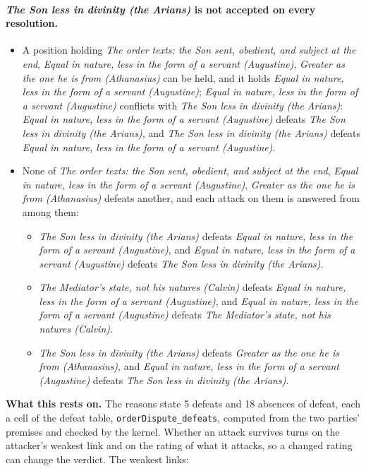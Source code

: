 \documentclass[11pt,paper=\testimonypaper,DIV=13,parskip=false]{scrartcl}
\begin{document}
\paragraph{\emph{The Son less in divinity (the Arians)} is not accepted on every resolution.}
\begin{itemize}
\item A position holding \emph{The order texts: the Son sent, obedient, and subject at the end}, \emph{Equal in nature, less in the form of a servant (Augustine)}, \emph{Greater as the one he is from (Athanasius)} can be held, and it holds \emph{Equal in nature, less in the form of a servant (Augustine)}; \emph{Equal in nature, less in the form of a servant (Augustine)} conflicts with \emph{The Son less in divinity (the Arians)}: \emph{Equal in nature, less in the form of a servant (Augustine)} defeats \emph{The Son less in divinity (the Arians)}, and \emph{The Son less in divinity (the Arians)} defeats \emph{Equal in nature, less in the form of a servant (Augustine)}.
\item None of \emph{The order texts: the Son sent, obedient, and subject at the end}, \emph{Equal in nature, less in the form of a servant (Augustine)}, \emph{Greater as the one he is from (Athanasius)} defeats another, and each attack on them is answered from among them:
\begin{itemize}
\item \emph{The Son less in divinity (the Arians)} defeats \emph{Equal in nature, less in the form of a servant (Augustine)}, and \emph{Equal in nature, less in the form of a servant (Augustine)} defeats \emph{The Son less in divinity (the Arians)}.
\item \emph{The Mediator’s state, not his natures (Calvin)} defeats \emph{Equal in nature, less in the form of a servant (Augustine)}, and \emph{Equal in nature, less in the form of a servant (Augustine)} defeats \emph{The Mediator’s state, not his natures (Calvin)}.
\item \emph{The Son less in divinity (the Arians)} defeats \emph{Greater as the one he is from (Athanasius)}, and \emph{Equal in nature, less in the form of a servant (Augustine)} defeats \emph{The Son less in divinity (the Arians)}.
\end{itemize}
\end{itemize}
\par\noindent\textbf{What this rests on.} The reasons state 5 defeats and 18 absences of defeat, each a cell of the defeat table, \texttt{order\allowbreak{}Dispute\_\allowbreak{}defeats}, computed from the two parties' premises and checked by the kernel. Whether an attack survives turns on the attacker's weakest link and on the rating of what it attacks, so a changed rating can change the verdict. The weakest links:
\end{document}
